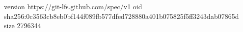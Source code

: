 version https://git-lfs.github.com/spec/v1
oid sha256:0c3563cb8eb0bf144f089fb577dfed728880a401b075825f5ff3243dab07865d
size 2796344
